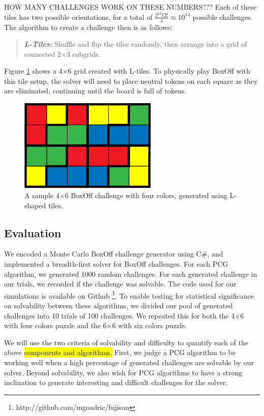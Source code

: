 \documentclass[journal]{IEEEtran}
\begin{document}
HOW MANY CHALLENGES WORK ON THESE NUMBERS???
Each of these tiles has two possible orientations, for a total of $\frac{2^{12}12!}{4} \approx 10^{14}$ possible challenges. 
The algorithm to create a challenge then is as follows:

\begin{quote}
    {\it \bf L-Tiles:} Shuffle and flip the tiles randomly, then arrange into a grid of connected 2$\times$3 subgrids. 
\end{quote}

Figure \ref{fig:boxofftiles} shows a 4$\times$6 grid created with L-tiles. To physically play BoxOff with this tile setup, the solver will need to place neutral tokens on each square as they are eliminated, continuing until the board is full of tokens. 

\begin{figure}[t]
\centering
\includegraphics[width=6.6cm]{boxoff46tiles.png}
\caption{A sample 4$\times$6 BoxOff challenge with four colors, generated using L-shaped tiles. }
\label{fig:boxofftiles}
\end{figure}

\subsection{Evaluation}

We encoded a Monte Carlo BoxOff challenge generator using C\#, and implemented a breadth-first solver for BoxOff challenges. For each PCG algorithm, we generated 1000 random challenges. For each generated challenge in our trials, we recorded if the challenge was solvable. The code used for our simulations is available on Github \footnote{http://github.com/mgoadric/fujisan}. 
To enable testing for statistical significance on solvability between these algorithms, we divided our pool of generated challenges into 10 trials of 100 challenges. We repeated this for both the 4$\times$6 with four colors puzzle and the 6$\times$6 with six colors puzzle.
 
We will use the two criteria of solvability and difficulty to quantify each of the above \hl{components and algorithms. }
First, we judge a PCG algorithm to be working well when a high percentage of generated challenges are solvable by our solver. Beyond solvability, we also wish for PCG algorithms to have a strong inclination to generate interesting and difficult challenges for the solver. 
\end{document}
